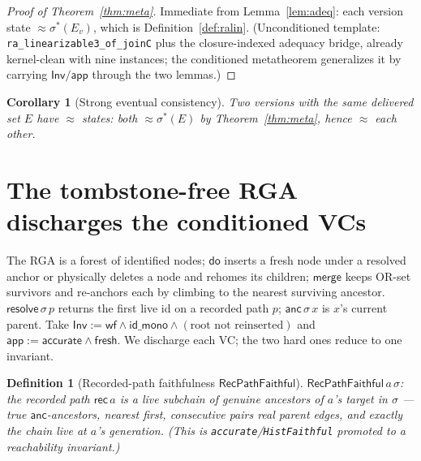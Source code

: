 \documentclass[11pt]{article}
\newtheorem{definition}[theorem]{Definition}
\newtheorem{corollary}[theorem]{Corollary}
\newcommand{\lean}[1]{\texttt{#1}}
\newcommand{\st}{\sigma}
\newcommand{\dodo}{\mathsf{do}}
\newcommand{\merge}{\mathsf{merge}}
\newcommand{\resolve}{\mathsf{resolve}}
\newcommand{\anc}{\mathsf{anc}}
\newcommand{\recList}{\mathsf{rec}}
\newcommand{\eqobs}{\approx}
\newcommand{\Inv}{\mathsf{Inv}}
\newcommand{\app}{\mathsf{app}}
\newcommand{\sigmacan}{\st^{\ast}}
\newcommand{\RVF}{\textsf{RecPathFaithful}}
\begin{document}
\begin{proof}[Proof of Theorem~\ref{thm:meta}]
Immediate from Lemma~\ref{lem:adeq}: each version state $\eqobs \sigmacan(E_v)$, which is
Definition~\ref{def:ralin}. (Unconditioned template: \lean{ra\_linearizable3\_of\_joinC} plus
the closure-indexed adequacy bridge, already kernel-clean with nine instances; the
conditioned metatheorem generalizes it by carrying $\Inv/\app$ through the two lemmas.)
\end{proof}

\begin{corollary}[Strong eventual consistency]\label{cor:sec}
Two versions with the same delivered set $E$ have $\eqobs$ states: both $\eqobs \sigmacan(E)$
by Theorem~\ref{thm:meta}, hence $\eqobs$ each other.
\end{corollary}

\section{The tombstone-free RGA discharges the conditioned VCs}\label{sec:rgaend}

The RGA is a forest of identified nodes; $\dodo$ inserts a fresh node under a resolved anchor
or physically deletes a node and rehomes its children; $\merge$ keeps OR-set survivors and
re-anchors each by climbing to the nearest surviving ancestor. $\resolve\,\st\,p$ returns the
first live id on a recorded path $p$; $\anc\,\st\,x$ is $x$'s current parent. Take
$\Inv := \mathsf{wf} \wedge \mathsf{id\_mono} \wedge (\text{root not reinserted})$ and
$\app := \mathsf{accurate} \wedge \mathsf{fresh}$. We discharge each VC; the two hard ones
reduce to one invariant.

\begin{definition}[Recorded-path faithfulness $\RVF$]\label{def:rvf}
$\RVF\,a\,\st$: the recorded path $\recList\,a$ is a \emph{live subchain of genuine
ancestors} of $a$'s target in $\st$ --- true $\anc$-ancestors, nearest first, consecutive
pairs real parent edges, and exactly the chain live at $a$'s generation. (This is
\lean{accurate}/\lean{HistFaithful} promoted to a reachability invariant.)
\end{definition}
\end{document}
